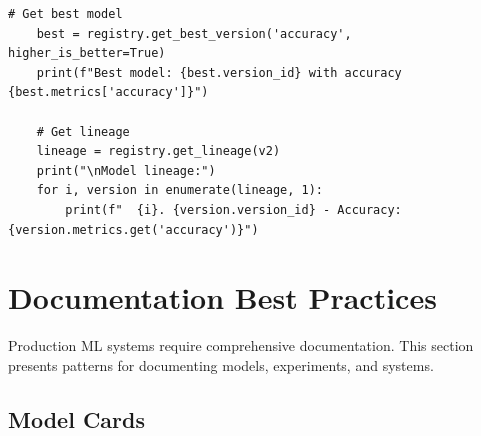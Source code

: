 \begin{lstlisting}[style=python, caption=Model versioning and experiment tracking]
    # Get best model
    best = registry.get_best_version('accuracy', higher_is_better=True)
    print(f"Best model: {best.version_id} with accuracy {best.metrics['accuracy']}")

    # Get lineage
    lineage = registry.get_lineage(v2)
    print("\nModel lineage:")
    for i, version in enumerate(lineage, 1):
        print(f"  {i}. {version.version_id} - Accuracy: {version.metrics.get('accuracy')}")
\end{lstlisting}

\section{Documentation Best Practices}

Production ML systems require comprehensive documentation. This section presents patterns for documenting models, experiments, and systems.

\subsection{Model Cards}

